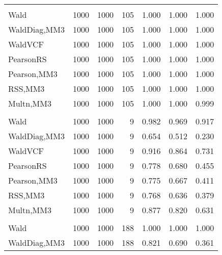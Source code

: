 \documentclass[
]{article}
\begin{document}
\begin{table}[H]
{\begin{tabular}[t]{lrrrrrr}
\addlinespace[0.3em]
\multicolumn{7}{l}{\textbf{1F 15V}}\\
\hspace{1em}Wald & 1000 & 1000 & 105 & 1.000 & 1.000 & 1.000\\
\hspace{1em}WaldDiag,MM3 & 1000 & 1000 & 105 & 1.000 & 1.000 & 1.000\\
\hspace{1em}WaldVCF & 1000 & 1000 & 105 & 1.000 & 1.000 & 1.000\\
\hspace{1em}PearsonRS & 1000 & 1000 & 105 & 1.000 & 1.000 & 1.000\\
\hspace{1em}Pearson,MM3 & 1000 & 1000 & 105 & 1.000 & 1.000 & 1.000\\
\hspace{1em}RSS,MM3 & 1000 & 1000 & 105 & 1.000 & 1.000 & 1.000\\
\hspace{1em}Multn,MM3 & 1000 & 1000 & 105 & 1.000 & 1.000 & 0.999\\
\addlinespace[0.3em]
\multicolumn{7}{l}{\textbf{2F 10V}}\\
\hspace{1em}Wald & 1000 & 1000 & 9 & 0.982 & 0.969 & 0.917\\
\hspace{1em}WaldDiag,MM3 & 1000 & 1000 & 9 & 0.654 & 0.512 & 0.230\\
\hspace{1em}WaldVCF & 1000 & 1000 & 9 & 0.916 & 0.864 & 0.731\\
\hspace{1em}PearsonRS & 1000 & 1000 & 9 & 0.778 & 0.680 & 0.455\\
\hspace{1em}Pearson,MM3 & 1000 & 1000 & 9 & 0.775 & 0.667 & 0.411\\
\hspace{1em}RSS,MM3 & 1000 & 1000 & 9 & 0.768 & 0.636 & 0.379\\
\hspace{1em}Multn,MM3 & 1000 & 1000 & 9 & 0.877 & 0.820 & 0.631\\
\addlinespace[0.3em]
\multicolumn{7}{l}{\textbf{3F 15V}}\\
\hspace{1em}Wald & 1000 & 1000 & 188 & 1.000 & 1.000 & 1.000\\
\hspace{1em}WaldDiag,MM3 & 1000 & 1000 & 188 & 0.821 & 0.690 & 0.361\\

\end{tabular}}
\end{table}
\end{document}
